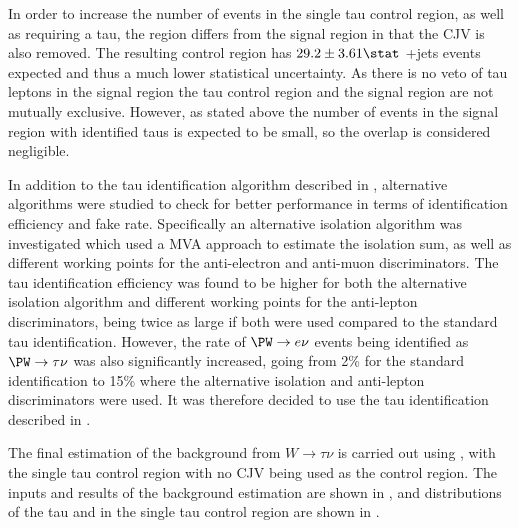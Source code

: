 In order to increase the number of events in the single tau control region, as well as requiring a tau, the region differs from the signal region in that the \ac{CJV} is also removed. The resulting control region has $29.2\pm 3.61\stat$ \PW+jets events expected and thus a much lower statistical uncertainty. As there is no veto of tau leptons in the signal region the tau control region and the signal region are not mutually exclusive. However, as stated above the number of events in the signal region with identified taus is expected to be small, so the overlap is considered negligible.

In addition to the tau identification algorithm described in , alternative algorithms were studied to check for better performance in terms of identification efficiency and fake rate. Specifically an alternative isolation algorithm was investigated which used a \ac{MVA} approach to estimate the isolation sum, as well as different working points for the anti-electron and anti-muon discriminators. The tau identification efficiency was found to be higher for both the alternative isolation algorithm and different working points for the anti-lepton discriminators, being twice as large if both were used compared to the standard tau identification. However, the rate of $\PW\rightarrow e\nu$ events being identified as $\PW\rightarrow\tau\nu$ was also significantly increased, going from 2\% for the standard identification to 15\% where the alternative isolation and anti-lepton discriminators were used. It was therefore decided to use the tau identification described in .

The final estimation of the background from $W\rightarrow\tau\nu$ is carried out using , with the single tau control region with no \ac{CJV} being used as the control region. The inputs and results of the background estimation are shown in , and distributions of the tau \pt and \dphijj in the single tau control region are shown in .

